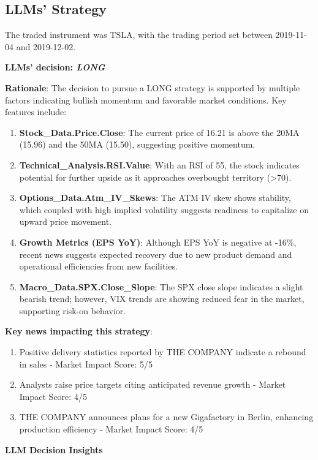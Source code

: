 \documentclass[8pt]{scrartcl}
\begin{document}
\newpage

\subsection*{LLMs' Strategy} \label{strategy4}

The traded instrument was TSLA, with the trading period set between 2019-11-04 and 2019-12-02.

\textbf{LLMs' decision: \textit{LONG}}

\textbf{Rationale}: The decision to pursue a LONG strategy is supported by multiple factors indicating bullish momentum and favorable market conditions. Key features include:
\begin{enumerate}
    \item \textbf{Stock\_Data.Price.Close}: The current price of 16.21 is above the 20MA (15.96) and the 50MA (15.50), suggesting positive momentum.
    \item \textbf{Technical\_Analysis.RSI.Value}: With an RSI of 55, the stock indicates potential for further upside as it approaches overbought territory (>70).
    \item \textbf{Options\_Data.Atm\_IV\_Skews}: The ATM IV skew shows stability, which coupled with high implied volatility suggests readiness to capitalize on upward price movement.
    \item \textbf{Growth Metrics (EPS YoY)}: Although EPS YoY is negative at -16\%, recent news suggests expected recovery due to new product demand and operational efficiencies from new facilities.
    \item \textbf{Macro\_Data.SPX.Close\_Slope}: The SPX close slope indicates a slight bearish trend; however, VIX trends are showing reduced fear in the market, supporting risk-on behavior.
\end{enumerate}

\textbf{Key news impacting this strategy}:
\begin{enumerate}
    \item Positive delivery statistics reported by THE COMPANY indicate a rebound in sales - Market Impact Score: 5/5
    \item Analysts raise price targets citing anticipated revenue growth - Market Impact Score: 4/5
    \item THE COMPANY announces plans for a new Gigafactory in Berlin, enhancing production efficiency - Market Impact Score: 4/5
\end{enumerate}

\textbf{LLM Decision Insights}
\end{document}
